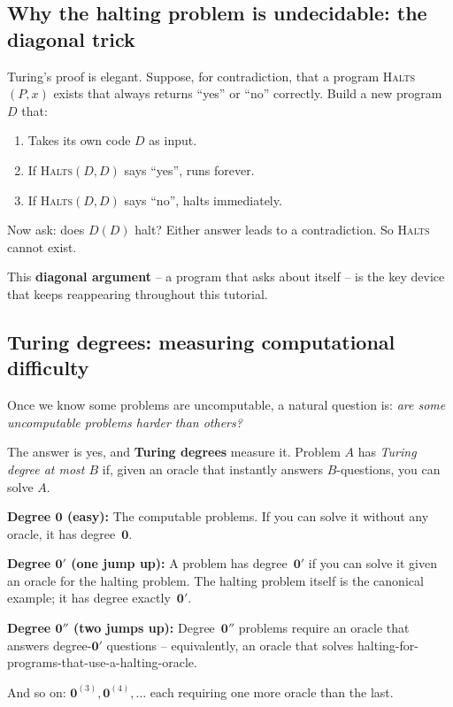 \documentclass[11pt,a4paper]{article}
\newcommand{\term}[1]{\textbf{#1}}
\newcommand{\zerp}{\mathbf{0}'}
\newcommand{\zer}{\mathbf{0}}
\newcommand{\zerpp}{\mathbf{0}''}
\begin{document}
\subsection{Why the halting problem is undecidable: the diagonal trick}

Turing's proof is elegant. Suppose, for contradiction, that a program
\textsc{Halts}$(P, x)$ exists that always returns ``yes'' or ``no'' correctly.
Build a new program $D$ that:
\begin{enumerate}
  \item Takes its own code $D$ as input.
  \item If \textsc{Halts}$(D, D)$ says ``yes'', runs forever.
  \item If \textsc{Halts}$(D, D)$ says ``no'', halts immediately.
\end{enumerate}
Now ask: does $D(D)$ halt? Either answer leads to a contradiction.
So \textsc{Halts} cannot exist.

This \term{diagonal argument} -- a program that asks about itself -- is the
key device that keeps reappearing throughout this tutorial.

\subsection{Turing degrees: measuring computational difficulty}

Once we know some problems are uncomputable, a natural question is:
\emph{are some uncomputable problems harder than others?}

The answer is yes, and \term{Turing degrees} measure it.
Problem $A$ has \emph{Turing degree at most $B$} if, given an oracle
that instantly answers $B$-questions, you can solve $A$.

\medskip
\noindent\textbf{Degree $\zer$ (easy):} The computable problems.
If you can solve it without any oracle, it has degree~$\zer$.

\medskip
\noindent\textbf{Degree $\zerp$ (one jump up):} A problem has degree~$\zerp$
if you can solve it given an oracle for the halting problem.
The halting problem itself is the canonical example; it has degree exactly~$\zerp$.

\medskip
\noindent\textbf{Degree $\zerpp$ (two jumps up):} Degree~$\zerpp$ problems
require an oracle that answers degree-$\zerp$ questions -- equivalently,
an oracle that solves halting-for-programs-that-use-a-halting-oracle.

And so on: $\zer^{(3)}, \zer^{(4)}, \ldots$ each requiring one more
oracle than the last.
\end{document}
